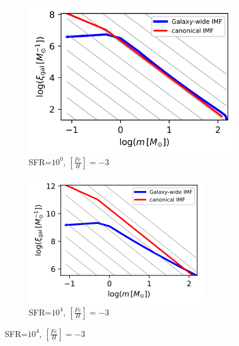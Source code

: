 \begin{figure}
	\centering
	\begin{subfigure}[b]{0.4\textwidth}
		\includegraphics[width=\textwidth]{sfr1-feh-3.png}
		\caption{SFR=$10^{0}$, $[\frac{Fe}{H}]=-3$}
		\label{fig:s1e4-1}
	\end{subfigure}
	\begin{subfigure}[b]{0.4\textwidth}
		\includegraphics[width=\textwidth]{sfr1e4-feh-3.png}
		\caption{SFR=$10^{4}$, $[\frac{Fe}{H}]=-3$}
		\label{fig:2d-5dt}
	\end{subfigure}
	

\end{figure}
